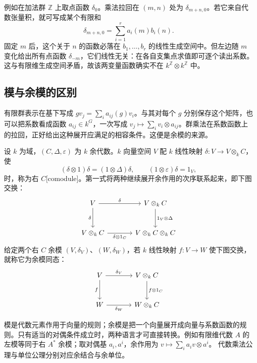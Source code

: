 \ProseParagraphBreak
例如在加法群 \(\mathbb Z\) 上取点函数 \(\delta_0\)。乘法拉回在 \((m,n)\) 处为 \(\delta_{m+n,0}\)。若它来自代数张量积，就可写成某个有限和
\[
	\delta_{m+n,0}=\sum_{i=1}^r a_i(m)b_i(n).
\]
固定 \(m\) 后，这个关于 \(n\) 的函数必落在 \(b_1,\ldots,b_r\) 的线性生成空间中。但左边随 \(m\) 变化给出所有点函数 \(\delta_{-m}\)，它们线性无关：在各自支集点求值即可逐个读出系数。这与有限维生成空间矛盾，故该两变量函数确实不在 \(k^{\mathbb Z}\otimes k^{\mathbb Z}\) 中。

\subsection{模与余模的区别}
\label{b5:subsec:2101:03}

有限群表示在基下写成 \(gv_j=\sum_i a_{ij}(g)v_i\)。与其对每个 \(g\) 分别保存这个矩阵，也可以把系数看成函数 \(a_{ij}\in k^G\)，一次写成 \(v_j\mapsto\sum_i v_i\otimes a_{ij}\)。群乘法在系数函数上的拉回，正好给出这种展开应满足的相容条件。这便是余模的来源。

\begin{definition}\label{b5:def:right-comodule}
	设 \(k\) 为域，\((C,\Delta,\varepsilon)\) 为 \(k\) 余代数。\(k\) 向量空间 \(V\) 配 \(k\) 线性映射 \(\delta:V\to V\otimes_k C\)，使
	\[
		(\delta\otimes1)\delta=(1\otimes\Delta)\delta,\qquad (1\otimes\varepsilon)\delta=1_V,
	\]
	时，称为右 \(C\)[comodule]。第一式将两种继续展开余作用的次序联系起来，即下图交换：
	\[
		\begin{tikzcd}[column sep=large,row sep=large]
			V\arrow[r,"\delta"]\arrow[d,"\delta"'] &V\otimes_kC\arrow[d,"1_V\otimes\Delta"]\\
			V\otimes_kC\arrow[r,"\delta\otimes1_C"'] &V\otimes_kC\otimes_kC
		\end{tikzcd}
	\]
	给定两个右 \(C\) 余模 \((V,\delta_V)\)、\((W,\delta_W)\)，若 \(k\) 线性映射 \(f:V\to W\) 使下图交换，就称它为余模同态：
	\[
		\begin{tikzcd}[column sep=large,row sep=large]
			V\arrow[r,"\delta_V"]\arrow[d,"f"'] &V\otimes_kC\arrow[d,"f\otimes1_C"]\\
			W\arrow[r,"\delta_W"']&W\otimes_kC
		\end{tikzcd}
	\]
\end{definition}
模是代数元素作用于向量的规则；余模是把一个向量展开成向量与系数函数的规则。只有适当的对偶条件成立时，两种语言才可直接转换。例如有限维代数 \(A\) 的左模等同于右 \(A^*\) 余模；取对偶基 \(a_i,a^i\)，余作用为 \(v\mapsto\sum_i a_iv\otimes a^i\)。 代数乘法公理与单位公理分别对应余结合与余单位。

